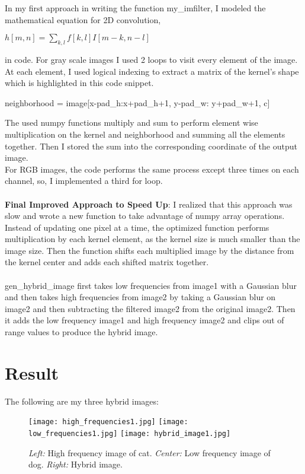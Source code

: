 In my first approach in writing the function my\_imfilter, I modeled the mathematical equation for 2D convolution,
\begin{center}
$h[m, n] = \sum_{k,l} f[k,l]I[m-k, n-l]$
\end{center}
in code. For gray scale images I used 2 loops to visit every element of the image. At each element, I used logical indexing to extract a matrix of the kernel's shape which is highlighted in this code snippet.
\begin{python}
neighborhood = image[x-pad_h:x+pad_h+1, y-pad_w: y+pad_w+1, c]
\end{python}
The used numpy functions multiply and sum to perform element wise multiplication on the kernel and neighborhood and summing all the elements together. Then I stored the sum into the corresponding coordinate of the output image.\\
For RGB images, the code performs the same process except three times on each channel, so, I implemented a third for loop. \\\\
\textbf{Final Improved Approach to Speed Up}: I realized that this approach was slow and wrote a new function to take advantage of numpy array operations. Instead of updating one pixel at a time, the optimized function performs multiplication by each kernel element, as the kernel size is much smaller than the image size. Then the function shifts each multiplied image by the distance from the kernel center and adds each shifted matrix together.
\\\\
gen\_hybrid\_image first takes low frequencies from image1 with a Gaussian blur and then takes high frequencies from image2 by taking a Gaussian blur on image2 and then subtracting the filtered image2 from the original image2. Then it adds the low frequency image1 and high frequency image2 and clips out of range values to produce the hybrid image.

\section*{Result}
The following are my three hybrid images:

\begin{figure} [h]
    \centering
    \texttt{[image: high\_frequencies1.jpg]}
    \texttt{[image: low\_frequencies1.jpg]}
    \texttt{[image: hybrid\_image1.jpg]}
    \caption{\emph{Left:} High frequency image of cat. \emph{Center:} Low frequency image of dog. \emph{Right:} Hybrid image.}
\end{figure}

